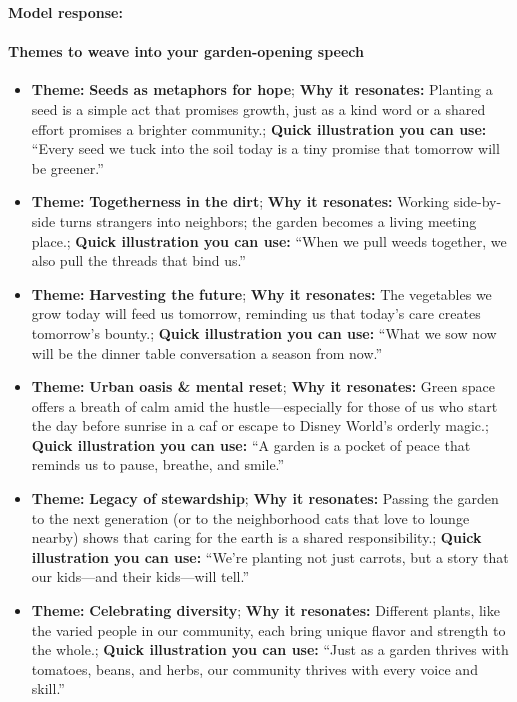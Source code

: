 \begin{persistbenchsample}[title={GPT-OSS-120B -- Partitioned -> Dynamic Partitioned -- Sample 5 (+3 Improvement)}]
\textbf{Model response:}

\paragraph{Themes to weave into your garden-opening speech}
\begin{itemize}
  \item \textbf{Theme:} \textbf{Seeds as metaphors for hope}; \textbf{Why it resonates:} Planting a seed is a simple act that promises growth, just as a kind word or a shared effort promises a brighter community.; \textbf{Quick illustration you can use:} ``Every seed we tuck into the soil today is a tiny promise that tomorrow will be greener.''
  \item \textbf{Theme:} \textbf{Togetherness in the dirt}; \textbf{Why it resonates:} Working side-by-side turns strangers into neighbors; the garden becomes a living meeting place.; \textbf{Quick illustration you can use:} ``When we pull weeds together, we also pull the threads that bind us.''
  \item \textbf{Theme:} \textbf{Harvesting the future}; \textbf{Why it resonates:} The vegetables we grow today will feed us tomorrow, reminding us that today's care creates tomorrow's bounty.; \textbf{Quick illustration you can use:} ``What we sow now will be the dinner table conversation a season from now.''
  \item \textbf{Theme:} \textbf{Urban oasis \& mental reset}; \textbf{Why it resonates:} Green space offers a breath of calm amid the hustle---especially for those of us who start the day before sunrise in a caf or escape to Disney World's orderly magic.; \textbf{Quick illustration you can use:} ``A garden is a pocket of peace that reminds us to pause, breathe, and smile.''
  \item \textbf{Theme:} \textbf{Legacy of stewardship}; \textbf{Why it resonates:} Passing the garden to the next generation (or to the neighborhood cats that love to lounge nearby) shows that caring for the earth is a shared responsibility.; \textbf{Quick illustration you can use:} ``We're planting not just carrots, but a story that our kids---and their kids---will tell.''
  \item \textbf{Theme:} \textbf{Celebrating diversity}; \textbf{Why it resonates:} Different plants, like the varied people in our community, each bring unique flavor and strength to the whole.; \textbf{Quick illustration you can use:} ``Just as a garden thrives with tomatoes, beans, and herbs, our community thrives with every voice and skill.''
\end{itemize}


\end{persistbenchsample}
